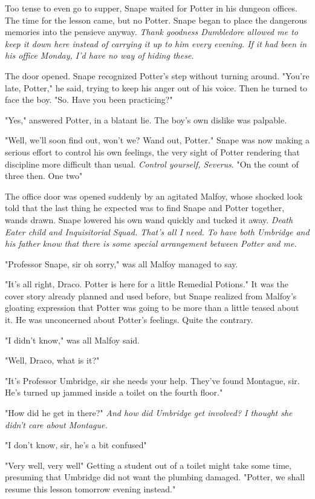 Too tense to even go to supper, Snape waited for Potter in his dungeon offices. The time for the lesson came, but no Potter. Snape began to place the dangerous memories into the pensieve anyway. \emph{Thank goodness Dumbledore allowed me to keep it down here instead of carrying it up to him every evening. If it had been in his office Monday, I'd have no way of hiding these.}

The door opened. Snape recognized Potter's step without turning around. "You're late, Potter," he said, trying to keep his anger out of his voice. Then he turned to face the boy. "So. Have you been practicing?"

"Yes," answered Potter, in a blatant lie. The boy's own dislike was palpable.

"Well, we'll soon find out, won't we? Wand out, Potter." Snape was now making a serious effort to control his own feelings, the very sight of Potter rendering that discipline more difficult than usual. \emph{Control yourself, Severus}. "On the count of three then. One{\el} two{\el}"

The office door was opened suddenly by an agitated Malfoy, whose shocked look told that the last thing he expected was to find Snape and Potter together, wands drawn. Snape lowered his own wand quickly and tucked it away. \emph{Death Eater child and Inquisitorial Squad. That's all I need. To have both Umbridge and his father know that there is some special arrangement between Potter and me.}

"Professor Snape, sir{\el} oh{\el} sorry," was all Malfoy managed to say.

"It's all right, Draco. Potter is here for a little Remedial Potions." It was the cover story already planned and used before, but Snape realized from Malfoy's gloating expression that Potter was going to be more than a little teased about it. He was unconcerned about Potter's feelings. Quite the contrary.

"I didn't know," was all Malfoy said.

"Well, Draco, what is it?"

"It's Professor Umbridge, sir{\el} she needs your help. They've found Montague, sir. He's turned up jammed inside a toilet on the fourth floor."

"How did he get in there?" \emph{And how did Umbridge get involved? I thought she didn't care about Montague.}

"I don't know, sir, he's a bit confused{\el}"

"Very well, very well{\el}" Getting a student out of a toilet might take some time, presuming that Umbridge did not want the plumbing damaged. "Potter, we shall resume this lesson tomorrow evening instead."

